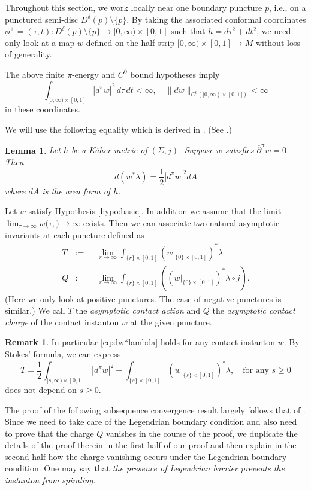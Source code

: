 \documentclass[reqno]{amsart}
\newcommand{\be}{\begin{equation}}
\newcommand{\ee}{\end{equation}}
\newcommand{\beastar}{\begin{eqnarray*}}
\newcommand{\eeastar}{\end{eqnarray*}}
\theoremstyle{theorem}
\newtheorem{lem}[thm]{Lemma}
\theoremstyle{definition}
\newtheorem{rem}[thm]{Remark}
\numberwithin{equation}{section}
\def\delbar{{\overline \partial}}
\def\delbar{{\overline \partial}}
\begin{document}
Throughout this section, we work locally near one boundary puncture $p$, i.e., on a punctured semi-disc
$D^\delta(p) \setminus \{p\}$. By taking the associated conformal coordinates $\phi^+ = (\tau,t)
:D^\delta(p) \setminus \{p\} \to [0, \infty)\times [0,1]$ such that $h = d\tau^2 + dt^2$,
we need only look at a map $w$ defined on the half strip $[0, \infty)\times [0,1]\to M$
without loss of generality.

The above finite $\pi$-energy and $C^0$ bound hypotheses imply
\be\label{eq:hypo-basic-pt}
\int_{[0, \infty)\times [0,1]}|d^\pi w|^2 \, d\tau \, dt <\infty, \quad \|d w\|_{C^0([0, \infty)\times [0,1])}<\infty
\ee
in these coordinates.

We will use the following equality which is derived in \cite{oh-wang:connection}. (See \cite[Equation (3.1)]{oh-wang:connection}.)
\begin{lem} Let $h$ be a K\"aher metric of $(\Sigma,j)$. Suppose $w$ satisfies $\delbar^\pi w = 0$. Then
\be\label{eq:dw*lambda}
d(w^*\lambda) = \frac12 |d^\pi w|^2 dA
\ee
where $dA$ is the area form of $h$.
\end{lem}

Let $w$ satisfy Hypothesis \ref{hypo:basic}.
In addition we assume that the limit $\lim_{\tau \to \infty} w(\tau, \dot) \to \infty$ exists. Then
we can associate two
natural asymptotic invariants at each puncture defined as
\beastar
T & := & \lim_{r \to \infty} \int_{\{r\}\times [0,1]} (w|_{\{0\}\times [0,1] })^*\lambda \label{eq:TQ-T}\\
Q & : = & \lim_{r \to \infty} \int_{\{r\}\times [0,1]}((w|_{\{0\}\times [0,1] })^*\lambda\circ j).\label{eq:TQ-Q}
\eeastar
(Here we only look at positive punctures. The case of negative punctures is similar.)
We call $T$ the \emph{asymptotic contact action}
and $Q$ the \emph{asymptotic contact charge} of the contact instanton $w$ at the given puncture.

\begin{rem}\label{rem:TQ}
In particular \eqref{eq:dw*lambda} holds for any contact instanton $w$.  By Stokes' formula, we can express
$$
T = \frac{1}{2} \int_{[s,\infty) \times [0,1]} |d^\pi w|^2 + \int_{\{s\}\times [0,1]}(w|_{\{s\}\times [0,1]})^*\lambda, \quad
\text{for any } s\geq 0
$$
does not depend on $s \geq 0$.
\end{rem}

The proof of the following subsequence convergence result largely follows that of
\cite[Theorem 6.4]{oh-wang:CR-map1}. Since we need to take care of the Legendrian boundary condition and also need to prove that the charge $Q$ vanishes in the course of the proof,
we duplicate the details of the proof therein in the first half of our proof and then
explain in the second half how the charge vanishing occurs
under the Legendrian boundary condition. One may say that \emph{the presence of Legendrian barrier
prevents the instanton from spiraling.}
\end{document}
